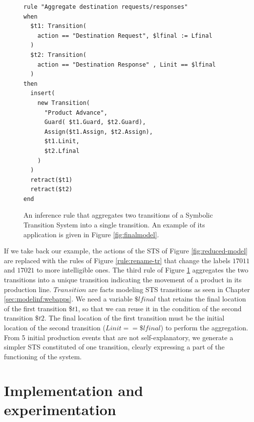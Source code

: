 \begin{figure}[ht]
\begin{framed}
\begin{BVerbatim}
rule "Aggregate destination requests/responses"
when
  $t1: Transition(
    action == "Destination Request", $lfinal := Lfinal
  )
  $t2: Transition(
    action == "Destination Response" , Linit == $lfinal
  )
then
  insert(
    new Transition(
      "Product Advance",
      Guard( $t1.Guard, $t2.Guard),
      Assign($t1.Assign, $t2.Assign),
      $t1.Linit,
      $t2.Lfinal
    )
  )
  retract($t1)
  retract($t2)
end
\end{BVerbatim}
\end{framed}

  \caption{An inference rule that aggregates two transitions of a
  Symbolic Transition System into a single transition. An example
  of its application is given in Figure \ref{fig:finalmodel}.}
  \label{rule:aggregate-tr}
\end{figure}

If we take back our example, the actions of the STS of Figure
\ref{fig:reduced-model} are replaced with the rules of Figure
\ref{rule:rename-tr} that change the labels $17011$ and
$17021$ to more intelligible ones. The third rule of
Figure \ref{rule:aggregate-tr} aggregates the two transitions
into a unique transition indicating the movement of a product in
its production line. $Transition$ are facts modeling STS
transitions as seen in Chapter \ref{sec:modelinf:webapps}. We
need a variable $\$lfinal$ that retains the final location of the
first transition $\$t1$, so that we can reuse it in the condition
of the second transition $\$t2$. The final location of the first
transition must be the initial location of the second transition
($Linit == \$lfinal$) to perform the aggregation.
From 5 initial production events that are not self-explanatory,
we generate a simpler STS constituted of one transition, clearly
expressing a part of the functioning of the system.



\section{Implementation and experimentation}
\label{sec:modelinf:prodsystems:results}


